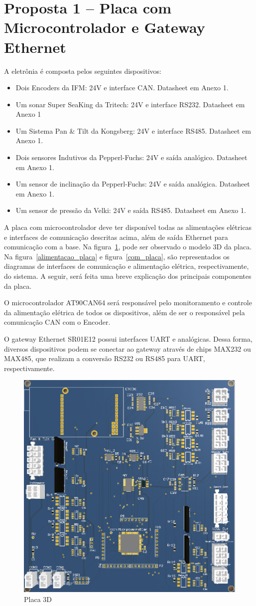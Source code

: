 \section{Proposta 1 – Placa com Microcontrolador e Gateway Ethernet}

A eletrônia é composta pelos seguintes dispositivos:
\begin{itemize}
  \item Dois Encoders da IFM: 24V e interface CAN. Datasheet em Anexo 1.
  \item Um sonar Super SeaKing da Tritech: 24V e interface RS232. Datasheet em
  Anexo 1
  \item Um Sistema Pan \& Tilt da Kongsberg: 24V e interface RS485. Datasheet em
  Anexo 1.
  \item Dois sensores Indutivos da Pepperl-Fuchs: 24V e saída analógico.
  Datasheet em Anexo 1.
  \item Um sensor de inclinação da Pepperl-Fuchs: 24V e saída analógica.
  Datasheet em Anexo 1.
  \item Um sensor de pressão da Velki: 24V e saída RS485. Datasheet em Anexo 1.
\end{itemize}	

A placa com microcontrolador deve ter disponível todas as alimentações elétricas
e interfaces de comunicação descritas acima, além de saída Ethernet para
comunicação com a base. Na figura~\ref{placa}, pode ser observado o modelo 3D da
placa. Na figura~\ref{alimentacao_placa} e figura~\ref{com_placa}, são
representados os diagramas de interfaces de comunicação e alimentação elétrica, respectivamente, do sistema. A seguir, será feita uma breve explicação dos principais componentes da placa.

O microcontrolador AT90CAN64 será responsável pelo monitoramento e controle da alimentação elétrica de todos os dispositivos, além de ser o responsável pela comunicação CAN com o Encoder. 

O gateway Ethernet SR01E12 possui interfaces UART e analógicas. Dessa forma, diversos dispositivos podem se conectar ao gateway através de chips MAX232 ou MAX485, que realizam a conversão RS232 ou RS485 para UART, respectivamente.
  
\begin{figure}[H]
    \centering
    \includegraphics[width=0.5\columnwidth]{figs/eletronica/1.png}
    \caption{Placa 3D}
    \label{placa}
\end{figure}

